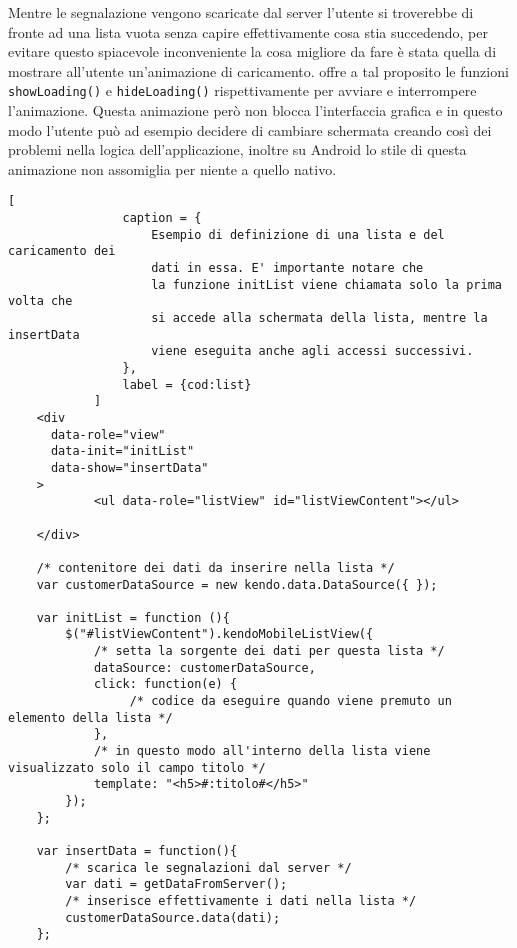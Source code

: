			Mentre le segnalazione vengono scaricate dal server l'utente si 
			troverebbe di fronte ad una lista vuota senza capire effettivamente 
			cosa stia succedendo, per evitare questo spiacevole inconveniente 
			la cosa migliore da fare è stata quella di mostrare all'utente un'animazione 
			di caricamento. \kendomob{} offre a tal proposito le funzioni
			\texttt{showLoading()} e \texttt{hideLoading()} rispettivamente per 
			avviare e interrompere l'animazione. Questa animazione però non blocca 
			l'interfaccia grafica e in questo modo l'utente può ad esempio decidere 
			di cambiare schermata creando così dei problemi nella logica dell'applicazione, 
			inoltre su Android lo stile di questa animazione non assomiglia per niente 
			a quello nativo.
			\begin{lstlisting}[
				caption = {
					Esempio di definizione di una lista e del caricamento dei 
					dati in essa. E' importante notare che
					la funzione initList viene chiamata solo la prima volta che 
					si accede alla schermata della lista, mentre la insertData 
					viene eseguita anche agli accessi successivi.
				},
				label = {cod:list}
			]
    <div 
      data-role="view" 
      data-init="initList" 
      data-show="insertData"
    >
	    	<ul data-role="listView" id="listViewContent"></ul>
	    
    </div>
    
    /* contenitore dei dati da inserire nella lista */
    var customerDataSource = new kendo.data.DataSource({ });
    
    var initList = function (){
		$("#listViewContent").kendoMobileListView({
			/* setta la sorgente dei dati per questa lista */
			dataSource: customerDataSource, 
			click: function(e) {
				 /* codice da eseguire quando viene premuto un elemento della lista */
			},
			/* in questo modo all'interno della lista viene visualizzato solo il campo titolo */
			template: "<h5>#:titolo#</h5>" 
		}); 
	};
	
	var insertData = function(){
		/* scarica le segnalazioni dal server */
		var dati = getDataFromServer();
		/* inserisce effettivamente i dati nella lista */ 
		customerDataSource.data(dati); 
	};	
			\end{lstlisting}
			

